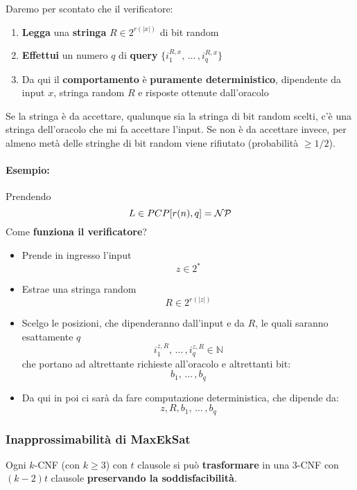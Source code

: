 Daremo per scontato che il verificatore: 
\begin{enumerate}
	\item \textbf{Legga} una \textbf{stringa} $R \in 2^{r(|x|)}$ di bit random
	\item \textbf{Effettui} un numero $q$ di \textbf{query} $\{i_1^{R,x}, \, \dots \, , i_q^{R,x}\}$
	\item Da qui il \textbf{comportamento} è \textbf{puramente deterministico}, dipendente da input $x$, stringa random $R$ e risposte ottenute dall'oracolo
\end{enumerate}

Se la stringa è da accettare, qualunque sia la stringa di bit random scelti, c'è una stringa dell'oracolo che mi fa accettare l'input. Se non è da accettare invece, per almeno metà delle stringhe di bit random viene rifiutato (probabilità $\geq 1/2$).\\


\newpage

\paragraph{Esempio:} Prendendo 
$$ L \in PCP [r(n), q] = \mathcal{NP} $$
Come \textbf{funziona il verificatore}?
\begin{itemize}
	\item Prende in ingresso l'input 
	$$ z \in 2^\ast$$
	\item Estrae una stringa random
	$$ R \in 2^{r(|z|)} $$
	\item Scelgo le posizioni, che dipenderanno dall'input e da $R$, le quali saranno esattamente $q$
	$$ i_{1}^{z,R}, \, \dots \, , i_{q}^{z,R} \in \mathbb{N} $$
	che portano ad altrettante richieste all'oracolo e altrettanti bit: 
	$$ b_1, \, \dots \, , b_q $$
	\item Da qui in poi ci sarà da fare computazione deterministica, che dipende da:
	$$ z, R, b_1, \, \dots \, , b_q $$
\end{itemize} 

\newpage

\subsubsection{Inapprossimabilità di MaxEkSat}
Ogni $k$-CNF (con $k \geq 3$) con $t$ clausole si può \textbf{trasformare} in una 3-CNF con $(k-2)t$ clausole \textbf{preservando la soddisfacibilità}.\\

